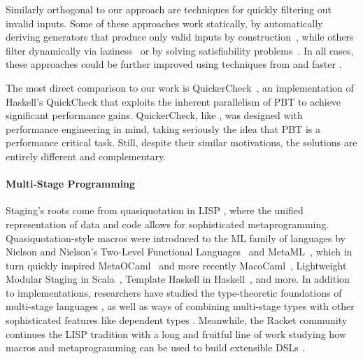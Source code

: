 \documentclass[acmsmall]{acmart}
\theoremstyle{definition}
\begin{document}
Similarly orthogonal to our approach are techniques for quickly filtering out
invalid inputs. Some of these approaches work statically,
by automatically deriving generators that produce only valid inputs by
construction~\cite{lampropoulosGeneratingGoodGenerators2017}, while others
filter dynamically via laziness~\cite{claessenGeneratingConstrainedRandom2015}
or by solving satisfiability
problems~\cite{seidelTypeTargetedTesting2015,steinhofelInputInvariants2022,lampropoulosBeginnerLuckLanguage2017}.
In all cases, these approaches could be further improved using
techniques from \name and faster \rands{}.

The most direct comparison to our work is
QuickerCheck~\cite{krookQuickerCheckImplementingEvaluating2024}, an
implementation of Haskell's QuickCheck that exploits the inherent parallelism of
PBT to achieve significant performance gains. QuickerCheck, like \name, was
designed with performance engineering in mind, taking seriously the idea that
PBT is a performance critical task. Still, despite their similar
motivations, the solutions are entirely different and complementary.

\paragraph{Multi-Stage Programming}
Staging's roots come from quasiquotation in LISP \cite{bawden99}, where the
unified representation of data and code allows for sophisticated
metaprogramming. Quasiquotation-style macros were introduced to the ML family of
languages by Nielson and Nielson's Two-Level Functional Languages~\cite{nielson92} and
MetaML~\cite{taha00}, which in turn quickly inspired MetaOCaml~\cite{metaocaml} and more recently
MacoCaml~\cite{macocaml}, Lightweight Modular Staging in Scala~\cite{lms}, Template
Haskell in Haskell~\cite{templatehaskell}, and more.  In addition to implementations, researchers
have studied the type-theoretic foundations of multi-stage languages \cite{cmtt,
davies-pfenning, davies17}, as well as ways of combining multi-stage types with
other sophisticated features like dependent types \cite{kovacs24}. Meanwhile,
the Racket community continues the LISP tradition with a long and fruitful
line of work studying how macros and metaprogramming can be used to build extensible
DSLs \cite[etc.]{flatt12, samth11, skthesis}.
\end{document}
